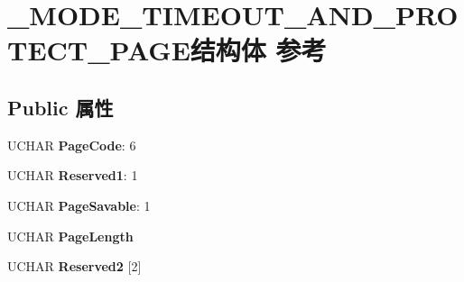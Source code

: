\hypertarget{struct___m_o_d_e___t_i_m_e_o_u_t___a_n_d___p_r_o_t_e_c_t___p_a_g_e}{}\section{\+\_\+\+M\+O\+D\+E\+\_\+\+T\+I\+M\+E\+O\+U\+T\+\_\+\+A\+N\+D\+\_\+\+P\+R\+O\+T\+E\+C\+T\+\_\+\+P\+A\+G\+E结构体 参考}
\label{struct___m_o_d_e___t_i_m_e_o_u_t___a_n_d___p_r_o_t_e_c_t___p_a_g_e}
\subsection*{Public 属性}
\begin{DoxyCompactItemize}
\item 
\mbox{\label{struct___m_o_d_e___t_i_m_e_o_u_t___a_n_d___p_r_o_t_e_c_t___p_a_g_e_a6ece887f7a9cb99cc148152425be2d6f}} 
U\+C\+H\+AR {\bfseries Page\+Code}\+: 6
\item 
\mbox{\label{struct___m_o_d_e___t_i_m_e_o_u_t___a_n_d___p_r_o_t_e_c_t___p_a_g_e_a429113dd4d2013f5f631f0b0a780c46c}} 
U\+C\+H\+AR {\bfseries Reserved1}\+: 1
\item 
\mbox{\label{struct___m_o_d_e___t_i_m_e_o_u_t___a_n_d___p_r_o_t_e_c_t___p_a_g_e_a7345bb289a776bb8dc8d20415427990c}} 
U\+C\+H\+AR {\bfseries Page\+Savable}\+: 1
\item 
\mbox{\label{struct___m_o_d_e___t_i_m_e_o_u_t___a_n_d___p_r_o_t_e_c_t___p_a_g_e_a98fc27d6a0fc1295be0d41ab85a9f2e1}} 
U\+C\+H\+AR {\bfseries Page\+Length}
\item 
\mbox{\label{struct___m_o_d_e___t_i_m_e_o_u_t___a_n_d___p_r_o_t_e_c_t___p_a_g_e_a2b6b26a22e39a5d5f3304bf856b44e29}} 
U\+C\+H\+AR {\bfseries Reserved2} \mbox{[}2\mbox{]}
\item 
\mbox{\label{struct___m_o_d_e___t_i_m_e_o_u_t___a_n_d___p_r_o_t_e_c_t___p_a_g_e_a5ca15fe6a140a4ecec723bee34af858a}} 

\end{DoxyCompactItemize}

